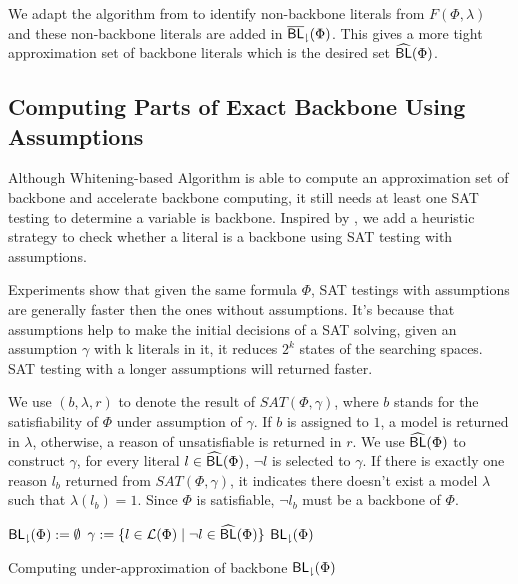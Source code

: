 We adapt the algorithm from \cite{Jon75} to identify non-backbone literals from $F(\Phi,\lambda)$ and these non-backbone literals are added in ${\sf \overline{BL}_\downharpoonright}(\Phi)$.
This gives a more tight approximation set of backbone literals which is the desired set ${\sf \widehat{BL}}(\Phi)$.
\fi

\subsection{Computing Parts of Exact Backbone Using Assumptions}

Although Whitening-based Algorithm is able to compute an approximation set of backbone and accelerate backbone computing, it still needs at least one SAT testing to determine a variable is backbone. Inspired by \cite{JLM15}, we add a heuristic strategy to check whether a literal is a backbone using SAT testing with assumptions.

Experiments show that given the same formula $\Phi$, SAT testings with assumptions are generally faster then the ones without assumptions. It's because that assumptions help to make the initial decisions of a SAT solving, given an assumption $\gamma$ with k literals in it, it reduces $2^k$ states of the searching spaces. SAT testing with a longer assumptions will returned faster.

We use $(b, \lambda, r)$ to denote the result of $SAT(\Phi,\gamma)$, where $b$ stands for the satisfiability of $\Phi$ under assumption of $\gamma$. If $b$ is assigned to $1$, a model is returned in $\lambda$, otherwise, a reason of unsatisfiable is returned in $r$. We use ${\sf \widehat{BL}}(\Phi)$ to construct $\gamma$, for every literal $l\in{\sf \widehat{BL}}(\Phi)$, $\neg l$ is selected to $\gamma$.
If there is exactly one reason $l_b$ returned from $SAT(\Phi,\gamma)$, it indicates there doesn't exist a model $\lambda$ such that $\lambda(l_b)=1$. Since $\Phi$ is satisfiable, $\neg l_b$ must be a backbone of $\Phi$.


\begin{algorithm2e}
\SetAlgoShortEnd
\SetFillComment
{}
${\sf {BL}_\downharpoonright}(\Phi):=\emptyset$\;
$\gamma:=\{l\in\Lit(\Phi) \mid \neg l\in\BLap(\Phi)\}$\; \label{alg4:init}
\Return ${\sf {BL}_\downharpoonright}(\Phi)$\;
\caption{Computing under-approximation of backbone ${\sf {BL}_\downharpoonright}(\Phi)$}
\label{alg:assum}
\end{algorithm2e}

